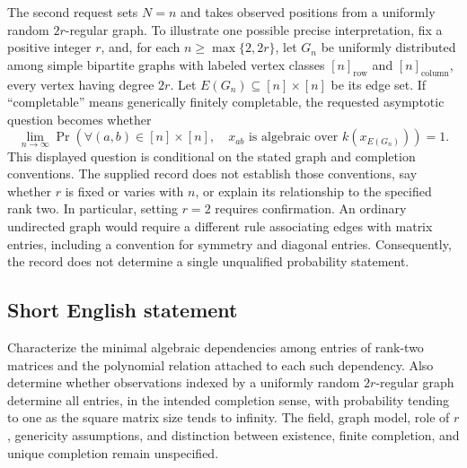 \documentclass[11pt]{article}
\begin{document}
The second request sets \(N=n\) and takes observed positions from a uniformly random \(2r\)-regular graph. To illustrate one possible precise interpretation, fix a positive integer \(r\), and, for each \(n\geq\max\{2,2r\}\), let \(G_n\) be uniformly distributed among simple bipartite graphs with labeled vertex classes \([n]_{\mathrm{row}}\) and \([n]_{\mathrm{column}}\), every vertex having degree \(2r\). Let \(E(G_n)\subseteq[n]\times[n]\) be its edge set. If ``completable'' means generically finitely completable, the requested asymptotic question becomes whether
\[
\lim_{n\to\infty}\Pr\!\left(
\forall(a,b)\in[n]\times[n],\quad
x_{ab}\text{ is algebraic over }k(x_{E(G_n)})
\right)=1.
\]
This displayed question is conditional on the stated graph and completion conventions. The supplied record does not establish those conventions, say whether \(r\) is fixed or varies with \(n\), or explain its relationship to the specified rank two. In particular, setting \(r=2\) requires confirmation. An ordinary undirected graph would require a different rule associating edges with matrix entries, including a convention for symmetry and diagonal entries. Consequently, the record does not determine a single unqualified probability statement.
\subsection{Short English statement}
Characterize the minimal algebraic dependencies among entries of rank-two matrices and the polynomial relation attached to each such dependency. Also determine whether observations indexed by a uniformly random \(2r\)-regular graph determine all entries, in the intended completion sense, with probability tending to one as the square matrix size tends to infinity. The field, graph model, role of \(r\), genericity assumptions, and distinction between existence, finite completion, and unique completion remain unspecified.
\end{document}
